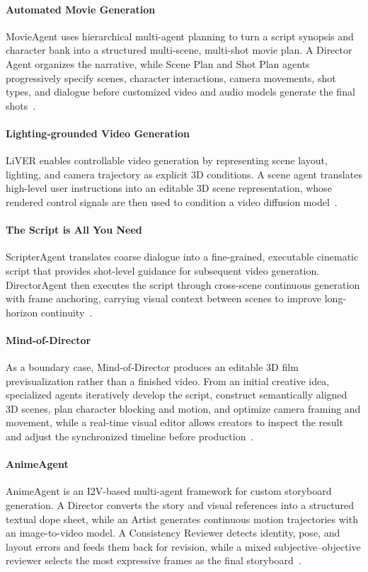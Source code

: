 \paragraph{Automated Movie Generation}
MovieAgent uses hierarchical multi-agent planning to turn a script synopsis and character bank into a structured multi-scene, multi-shot movie plan. A Director Agent organizes the narrative, while Scene Plan and Shot Plan agents progressively specify scenes, character interactions, camera movements, shot types, and dialogue before customized video and audio models generate the final shots~\cite{avg250307314}.

\paragraph{Lighting-grounded Video Generation}
LiVER enables controllable video generation by representing scene layout, lighting, and camera trajectory as explicit 3D conditions. A scene agent translates high-level user instructions into an editable 3D scene representation, whose rendered control signals are then used to condition a video diffusion model~\cite{avg260407966}.

\paragraph{The Script is All You Need}
ScripterAgent translates coarse dialogue into a fine-grained, executable cinematic script that provides shot-level guidance for subsequent video generation. DirectorAgent then executes the script through cross-scene continuous generation with frame anchoring, carrying visual context between scenes to improve long-horizon continuity~\cite{avg260117737}.

\paragraph{Mind-of-Director}
As a boundary case, Mind-of-Director produces an editable 3D film previsualization rather than a finished video. From an initial creative idea, specialized agents iteratively develop the script, construct semantically aligned 3D scenes, plan character blocking and motion, and optimize camera framing and movement, while a real-time visual editor allows creators to inspect the result and adjust the synchronized timeline before production~\cite{avg260314790}.

\paragraph{AnimeAgent}
AnimeAgent is an I2V-based multi-agent framework for custom storyboard generation. A Director converts the story and visual references into a structured textual dope sheet, while an Artist generates continuous motion trajectories with an image-to-video model. A Consistency Reviewer detects identity, pose, and layout errors and feeds them back for revision, while a mixed subjective--objective reviewer selects the most expressive frames as the final storyboard~\cite{avg260220664}.

